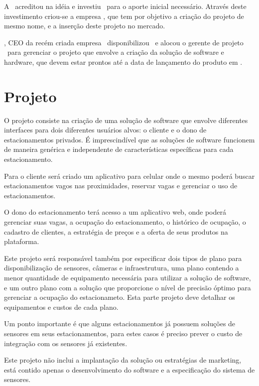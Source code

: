 A \investorCompanyName\ acreditou na idéia e investiu \ventureBudget\ para o aporte inicial necessário. Através deste investimento criou-se a empresa \startupCompanyName, que tem por objetivo a criação do projeto de mesmo nome, e a inserção deste projeto no mercado.

\ceoName, CEO da recém criada empresa \startupCompanyName\, disponibilizou \maximumBudget\ e alocou o gerente de projeto \projectManagerName\ para gerenciar o projeto que envolve a criação da solução de software e hardware, que devem estar prontos até a data de lançamento do produto em \maximumDeadline.



\section{Projeto}

O projeto consiste na criação de uma solução de software que envolve diferentes interfaces para dois diferentes usuários alvos: o cliente e o dono de estacionamentos privados. É imprescindível que as soluções de software funcionem de maneira genérica e independente de características específicas para cada estacionamento. 

Para o cliente será criado um aplicativo para celular onde o mesmo poderá buscar estacionamentos vagos nas proximidades, reservar vagas e gerenciar o uso de estacionamentos.

O dono do estacionamento terá acesso a um aplicativo web, onde poderá gerenciar suas vagas, a ocupação do estacionamento, o histórico de ocupação, o cadastro de clientes, a estratégia de preços e a oferta de seus produtos na plataforma.

Este projeto será responsável também por especificar dois tipos de plano para disponibilização de sensores, câmeras e infraestrutura, uma plano contendo a menor quantidade de equipamento necessária para utilizar a solução de software, e um outro plano com a solução que proporcione o nível de precisão óptimo para gerenciar a ocupação do estacionameto. Esta parte projeto deve detalhar os equipamentos e custos de cada plano.

Um ponto importante é que alguns estacionamentos já possuem soluções de sensores em seus estacionamentos, para estes casos é preciso prever o custo de integração com os sensores já existentes.

Este projeto não inclui a implantação da solução ou estratégias de marketing, está contido apenas o desenvolvimento do software e a especificação do sistema de sensores.